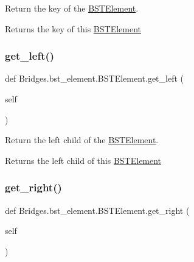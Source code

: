 Return the key of the \mbox{\hyperlink{class_bridges_1_1bst__element_1_1_b_s_t_element}{B\+S\+T\+Element}}. 

\begin{DoxyReturn}{Returns}
the key of this \mbox{\hyperlink{class_bridges_1_1bst__element_1_1_b_s_t_element}{B\+S\+T\+Element}} 
\end{DoxyReturn}
\mbox{\label{class_bridges_1_1bst__element_1_1_b_s_t_element_a7f12207f3859f60be107468000cc2375}} 
\subsubsection{\texorpdfstring{get\+\_\+left()}{get\_left()}}
{\footnotesize\ttfamily def Bridges.\+bst\+\_\+element.\+B\+S\+T\+Element.\+get\+\_\+left (\begin{DoxyParamCaption}\item[{}]{self }\end{DoxyParamCaption})}



Return the left child of the \mbox{\hyperlink{class_bridges_1_1bst__element_1_1_b_s_t_element}{B\+S\+T\+Element}}. 

\begin{DoxyReturn}{Returns}
the left child of this \mbox{\hyperlink{class_bridges_1_1bst__element_1_1_b_s_t_element}{B\+S\+T\+Element}} 
\end{DoxyReturn}
\mbox{\label{class_bridges_1_1bst__element_1_1_b_s_t_element_a96c3a91946f244720054c2d480a05955}} 
\subsubsection{\texorpdfstring{get\+\_\+right()}{get\_right()}}
{\footnotesize\ttfamily def Bridges.\+bst\+\_\+element.\+B\+S\+T\+Element.\+get\+\_\+right (\begin{DoxyParamCaption}\item[{}]{self }\end{DoxyParamCaption})}



